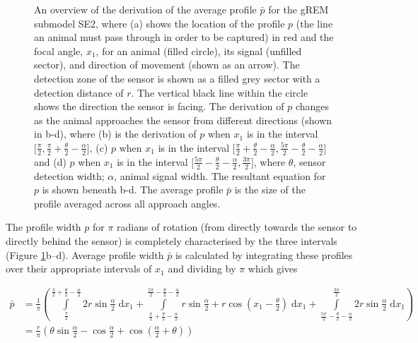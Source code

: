 \begin{figure}[t]
\caption[An overview of the derivation of the average profile $\bar{p}$ for the gREM submodel SE2]{
An overview of the derivation of the average profile $\bar{p}$ for the gREM submodel SE2, where (a) shows the location of the profile $p$ (the line an animal must pass through in order to be captured) in red and the focal angle, $x_1$, for an animal (filled circle), its signal (unfilled sector), and direction of movement (shown as an arrow).
The detection zone of the sensor is shown as a filled grey sector with a detection distance of $r$.
The vertical black line within the circle shows the direction the sensor is facing.
The derivation of $p$ changes as the animal approaches the sensor from different directions (shown in b-d), where (b) is the derivation of $p$ when $x_1$ is in the interval $\lbrack\frac{\pi}{2}, \frac{\pi}{2} + \frac{\theta}{2} - \frac{\alpha}{2}\rbrack$, (c)  $p$ when $x_1$ is in the interval $\lbrack\frac{\pi}{2} + \frac{\theta}{2} - \frac{\alpha}{2}, \frac{5 \pi}{2} - \frac{\theta}{2} - \frac{\alpha}{2} \rbrack$ and (d) $p$ when $x_1$ is in the interval $\lbrack\frac{5 \pi}{2} - \frac{\theta}{2} - \frac{\alpha}{2}, \frac{3 \pi}{2}\rbrack$, where $\theta$, sensor detection width; $\alpha$, animal signal width.
The resultant equation for $p$ is shown beneath b-d.
The average profile $\bar{p}$ is the size of the profile averaged across all approach angles.}
\label{f:x1AndInt}

\end{figure}

The profile width $p$ for $\pi$ radians of rotation (from directly towards the sensor to directly behind the sensor) is completely characterised by the three intervals (Figure \ref{f:x1AndInt}b--d).
Average profile width $\bar{p}$ is calculated by integrating these profiles over their appropriate intervals of $x_1$ and dividing by $\pi$ which gives

\begin{align}
    \bar{p} &=\frac{1}{\pi} \left(\int\limits_{\frac{\pi}{2}}^{\frac{\pi}{2} + \frac{\theta}{2} - \frac{\alpha}{2}}2 r \sin{\frac{\alpha}{2} }\;\mathrm{d}x_1+\int\limits_{\frac{\pi}{2} + \frac{\theta}{2} - \frac{\alpha}{2}}^{\frac{5 \pi}{2} - \frac{\theta}{2} - \frac{\alpha}{2}}r \sin{\frac{\alpha}{2} } + r \cos{\left (x_1 - \frac{\theta}{2} \right )}\;\mathrm{d}x_1+\int\limits_{\frac{5 \pi}{2} - \frac{\theta}{2} - \frac{\alpha}{2}}^{\frac{3 \pi}{2}}2 r \sin{\frac{\alpha}{2} }\;\mathrm{d}x_1\right) \label{e:SE2int}  \\
     &= \frac{r}{\pi} \left(\theta \sin{\frac{\alpha}{2} } - \cos{\frac{\alpha}{2} } + \cos{\left (\frac{\alpha}{2} + \theta \right )}\right) \label{e:SE2result}
\end{align}


